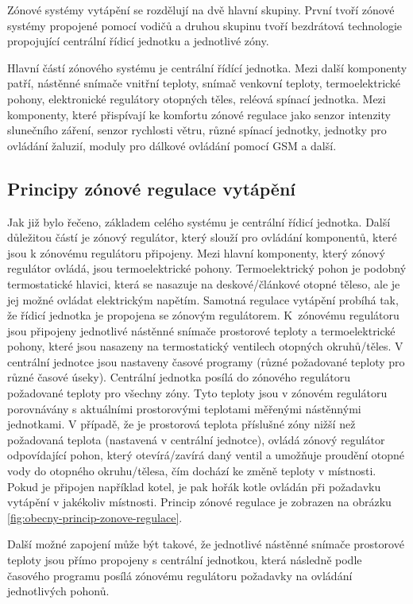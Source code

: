 Zónové systémy vytápění se rozdělují na dvě hlavní skupiny. První tvoří zónové systémy propojené pomocí vodičů a druhou skupinu tvoří bezdrátová technologie propojující centrální řídicí jednotku a jednotlivé zóny. 

Hlavní částí zónového systému je centrální řídící jednotka. Mezi další komponenty patří, nástěnné snímače vnitřní teploty, snímač venkovní teploty, termoelektrické pohony, elektronické regulátory otopných těles, reléová spínací jednotka. Mezi komponenty, které přispívají ke komfortu zónové regulace jako senzor intenzity slunečního záření, senzor rychlosti větru, různé spínací jednotky, jednotky pro ovládání žaluzií, moduly pro dálkové ovládání pomocí GSM a další.

\subsection{Principy zónové regulace vytápění}

Jak již bylo řečeno, základem celého systému je centrální řídicí jednotka. Další důležitou částí je zónový regulátor, který slouží pro ovládání komponentů, které jsou k zónovému regulátoru připojeny. Mezi hlavní komponenty, který zónový regulátor ovládá, jsou termoelektrické pohony. Termoelektrický pohon je podobný termostatické hlavici, která se nasazuje na deskové/článkové otopné těleso, ale je jej možné ovládat elektrickým napětím. Samotná regulace vytápění probíhá tak, že řídicí jednotka je propojena se zónovým regulátorem. K~zónovému regulátoru jsou připojeny jednotlivé nástěnné snímače prostorové teploty a termoelektrické pohony, které jsou nasazeny na termostatický ventilech otopných okruhů/těles. V centrální jednotce jsou nastaveny časové programy (různé požadované teploty pro různé časové úseky). Centrální jednotka posílá do zónového regulátoru požadované teploty pro všechny zóny. Tyto  teploty jsou v zónovém regulátoru porovnávány s aktuálními prostorovými teplotami měřenými nástěnnými jednotkami. V případě, že je prostorová teplota příslušné zóny nižší než požadovaná teplota (nastavená v centrální jednotce), ovládá zónový regulátor odpovídající pohon, který otevírá/zavírá daný ventil a umožňuje proudění otopné vody do otopného okruhu/tělesa, čím dochází ke změně teploty v místnosti. Pokud je připojen například kotel, je pak hořák kotle ovládán při požadavku vytápění v jakékoliv místnosti. Princip zónové regulace je zobrazen na obrázku \ref{fig:obecny-princip-zonove-regulace}.

Další možné zapojení může být takové, že jednotlivé nástěnné snímače prostorové teploty jsou přímo propojeny s centrální jednotkou, která následně podle časového programu posílá zónovému regulátoru požadavky na ovládání jednotlivých pohonů. 

